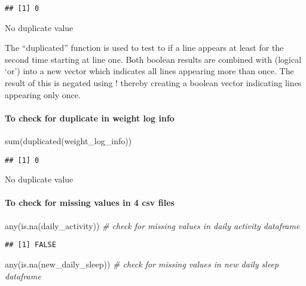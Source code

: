 \documentclass[
]{article}
\newenvironment{Shaded}{\begin{snugshade}}{\end{snugshade}}
\newcommand{\CommentTok}[1]{\textcolor[rgb]{0.56,0.35,0.01}{\textit{#1}}}
\newcommand{\FunctionTok}[1]{\textcolor[rgb]{0.00,0.00,0.00}{#1}}
\newcommand{\NormalTok}[1]{#1}
\begin{document}
\begin{verbatim}
## [1] 0
\end{verbatim}

No duplicate value

The ``duplicated'' function is used to test to if a line appears at
least for the second time starting at line one. Both boolean results are
combined with \textbar{} (logical `or') into a new vector which
indicates all lines appearing more than once. The result of this is
negated using ! thereby creating a boolean vector indicating lines
appearing only once.

\hypertarget{to-check-for-duplicate-in-weight-log-info}{%
\paragraph{To check for duplicate in weight log
info}\label{to-check-for-duplicate-in-weight-log-info}}

\begin{Shaded}
\begin{Highlighting}[]
\FunctionTok{sum}\NormalTok{(}\FunctionTok{duplicated}\NormalTok{(weight\_log\_info))}
\end{Highlighting}
\end{Shaded}

\begin{verbatim}
## [1] 0
\end{verbatim}

No duplicate value

\hypertarget{to-check-for-missing-values-in-4-csv-files}{%
\paragraph{To check for missing values in 4 csv
files}\label{to-check-for-missing-values-in-4-csv-files}}

\begin{Shaded}
\begin{Highlighting}[]
\FunctionTok{any}\NormalTok{(}\FunctionTok{is.na}\NormalTok{(daily\_activity)) }\CommentTok{\# check for missing values in daily activity dataframe}
\end{Highlighting}
\end{Shaded}

\begin{verbatim}
## [1] FALSE
\end{verbatim}

\begin{Shaded}
\begin{Highlighting}[]
\FunctionTok{any}\NormalTok{(}\FunctionTok{is.na}\NormalTok{(new\_daily\_sleep)) }\CommentTok{\# check for missing values in new daily sleep dataframe}
\end{Highlighting}
\end{Shaded}
\end{document}
